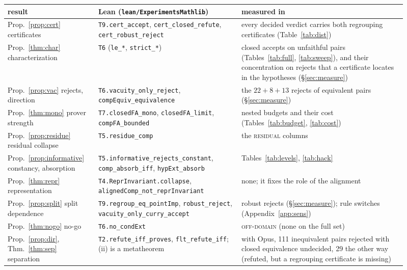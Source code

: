 \documentclass[10pt]{article}
\theoremstyle{definition}
\newcommand{\V}[1]{\textsc{#1}}
\begin{document}
\begin{table}[h]
\centering\small
\begin{tabular}{p{0.2\linewidth}p{0.33\linewidth}p{0.38\linewidth}}
\toprule
result & Lean (\texttt{lean/ExperimentsMathlib}) & measured in\\
\midrule
Prop.~\ref{prop:cert} certificates & \texttt{T9.cert\_accept}, \texttt{cert\_closed\_refute}, \texttt{cert\_robust\_reject} & every decided verdict carries both regrouping certificates (Table~\ref{tab:dist})\\
Prop.~\ref{thm:char} characterization & \texttt{T6} (\texttt{le\_*}, \texttt{strict\_*}) & closed accepts on unfaithful pairs (Tables~\ref{tab:full}, \ref{tab:sweep}), and their concentration on rejects that a certificate locates in the hypotheses (\S\ref{sec:measure})\\
Prop.~\ref{prop:vac} rejects, direction & \texttt{T6.vacuity\_only\_reject}, \texttt{compEquiv\_equivalence} & the $22+8+13$ rejects of equivalent pairs (\S\ref{sec:measure})\\
Prop.~\ref{thm:mono} prover strength & \texttt{T7.closedFA\_mono}, \texttt{closedFA\_limit}, \texttt{compFA\_bounded} & nested budgets and their cost (Tables~\ref{tab:budget}, \ref{tab:cost})\\
Prop.~\ref{prop:residue} residual collapse & \texttt{T5.residue\_comp} & the \V{residual} columns\\
Prop.~\ref{prop:informative} constancy, absorption & \texttt{T5.informative\_rejects\_constant}, \texttt{comp\_absorb\_iff}, \texttt{hypExt\_absorb} & Tables~\ref{tab:levels}, \ref{tab:hack}\\
Prop.~\ref{thm:repr} representation & \texttt{T4.ReprInvariant.collapse}, \texttt{alignedComp\_not\_reprInvariant} & none; it fixes the role of the alignment\\
Prop.~\ref{prop:split} split dependence & \texttt{T9.regroup\_eq\_pointImp}, \texttt{robust\_reject}, \texttt{vacuity\_only\_curry\_accept} & robust rejects (\S\ref{sec:measure}); rule switches (Appendix~\ref{app:sens})\\
Prop.~\ref{thm:nogo} no-go & \texttt{T6.no\_condExt} & \V{off-domain} (none on the full set)\\
Prop.~\ref{prop:dir}, Thm.~\ref{thm:sep} separation & \texttt{T2.refute\_iff\_proves}, \texttt{flt\_refute\_iff}; (ii) is a metatheorem & with Opus, 111 inequivalent pairs rejected with closed equivalence undecided, 29 the other way (refuted, but a regrouping certificate is missing)\\

\end{tabular}
\end{table}
\end{document}
